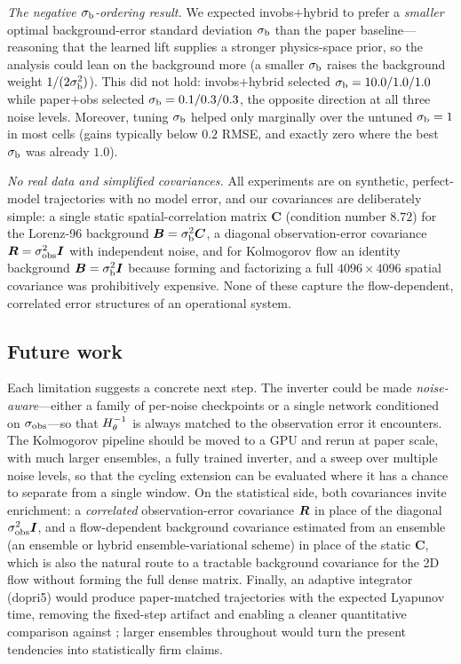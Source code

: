 \emph{The negative $\sigma_{\mathrm{b}}$-ordering result.} We expected
invobs$+$hybrid to prefer a \emph{smaller} optimal background-error standard
deviation $\sigma_{\mathrm{b}}$ than the paper baseline---reasoning that the learned lift
supplies a stronger physics-space prior, so the analysis could lean on the
background more (a smaller $\sigma_{\mathrm{b}}$ raises the background weight
$1/(2\sigma_{\mathrm{b}}^2)$). This did not hold: invobs$+$hybrid selected
$\sigma_{\mathrm{b}} = 10.0/1.0/1.0$ while paper$+$obs selected $\sigma_{\mathrm{b}} = 0.1/0.3/0.3$, the
opposite direction at all three noise levels. Moreover, tuning $\sigma_{\mathrm{b}}$ helped
only marginally over the untuned $\sigma_{\mathrm{b}} = 1$ in most cells (gains typically
below $0.2$ RMSE, and exactly zero where the best $\sigma_{\mathrm{b}}$ was already $1.0$).

\emph{No real data and simplified covariances.} All experiments are on
synthetic, perfect-model trajectories with no model error, and our covariances
are deliberately simple: a single static spatial-correlation matrix $\bm{C}$
(condition number $8.72$) for the Lorenz-96 background $\bm{B} = \sigma_{\mathrm{b}}^2 \bm{C}$,
a diagonal observation-error covariance $\bm{R} = \sigma_{\mathrm{obs}}^2 \bm{I}$ with
independent noise, and for Kolmogorov flow an identity background
$\bm{B} = \sigma_{\mathrm{b}}^2 \bm{I}$ because forming and factorizing a full
$4096 \times 4096$ spatial covariance was prohibitively expensive. None of
these capture the flow-dependent, correlated error structures of an
operational system.

\subsection{Future work}

Each limitation suggests a concrete next step. The inverter could be made
\emph{noise-aware}---either a family of per-noise checkpoints or a single
network conditioned on $\sigma_{\mathrm{obs}}$---so that $H^{-1}_{\theta}$ is always matched to the
observation error it encounters. The Kolmogorov pipeline should be moved to a
GPU and rerun at paper scale, with much larger ensembles, a fully trained
inverter, and a sweep over multiple noise levels, so that the cycling
extension can be evaluated where it has a chance to separate from a single
window. On the statistical side, both covariances invite enrichment: a
\emph{correlated} observation-error covariance $\bm{R}$ in place of the diagonal
$\sigma_{\mathrm{obs}}^2 \bm{I}$, and a flow-dependent background covariance estimated from an
ensemble (an ensemble or hybrid ensemble-variational scheme) in place of the
static $\bm{C}$, which is also the natural route to a tractable background
covariance for the 2D flow without forming the full dense matrix. Finally, an
adaptive integrator (dopri5) would produce paper-matched trajectories with the
expected Lyapunov time, removing the fixed-step artifact and enabling a cleaner
quantitative comparison against \citet{frerix2021invobs}; larger ensembles
throughout would turn the present tendencies into statistically firm claims.

